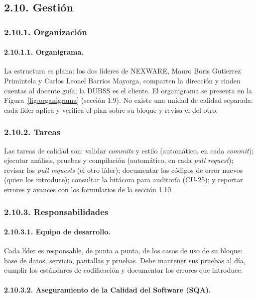 \subsection{2.10. Gestión}

\subsubsection{2.10.1. Organización}

\paragraph{2.10.1.1. Organigrama.}

La estructura es plana: los dos líderes de NEXWARE, Mauro Boris Gutierrez Primintela y Carlos Leonel Barrios Mayorga, comparten la dirección y rinden cuentas al docente guía; la DUBSS es el cliente. El organigrama se presenta en la Figura~\ref{fig:organigrama} (sección 1.9). No existe una unidad de calidad separada: cada líder aplica y verifica el plan sobre su bloque y revisa el del otro.

\subsubsection{2.10.2. Tareas}

Las tareas de calidad son: validar \textit{commits} y estilo (automático, en cada \textit{commit}); ejecutar análisis, pruebas y compilación (automático, en cada \textit{pull request}); revisar los \textit{pull requests} (el otro líder); documentar los códigos de error nuevos (quien los introduce); consultar la bitácora para auditoría (CU-25); y reportar errores y avances con los formularios de la sección 1.10.

\subsubsection{2.10.3. Responsabilidades}

\paragraph{2.10.3.1. Equipo de desarrollo.}

Cada líder es responsable, de punta a punta, de los casos de uso de su bloque: base de datos, servicio, pantallas y pruebas. Debe mantener sus pruebas al día, cumplir los estándares de codificación y documentar los errores que introduce.

\paragraph{2.10.3.2. Aseguramiento de la Calidad del Software (SQA).}

